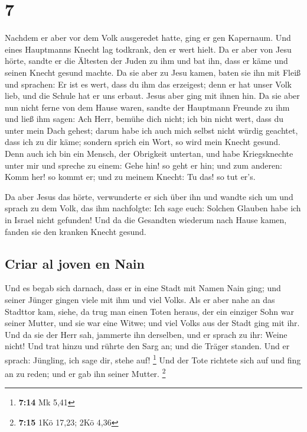 \hypertarget{section-6}{%
\section{7}\label{section-6}}

 Nachdem er aber vor dem Volk ausgeredet hatte, ging er
gen Kapernaum.  Und eines Hauptmanns Knecht lag todkrank,
den er wert hielt.  Da er aber von Jesu hörte, sandte er
die Ältesten der Juden zu ihm und bat ihn, dass er käme und seinen
Knecht gesund machte.  Da sie aber zu Jesu kamen, baten
sie ihn mit Fleiß und sprachen: Er ist es wert, dass du ihm das
erzeigest;  denn er hat unser Volk lieb, und die Schule
hat er uns erbaut.  Jesus aber ging mit ihnen hin. Da sie
aber nun nicht ferne von dem Hause waren, sandte der Hauptmann Freunde
zu ihm und ließ ihm sagen: Ach Herr, bemühe dich nicht; ich bin nicht
wert, dass du unter mein Dach gehest;  darum habe ich auch
mich selbst nicht würdig geachtet, dass ich zu dir käme; sondern sprich
ein Wort, so wird mein Knecht gesund.  Denn auch ich bin
ein Mensch, der Obrigkeit untertan, und habe Kriegsknechte unter mir und
spreche zu einem: Gehe hin! so geht er hin; und zum anderen: Komm her!
so kommt er; und zu meinem Knecht: Tu das! so tut er's.

 Da aber Jesus das hörte, verwunderte er sich über ihn und
wandte sich um und sprach zu dem Volk, das ihm nachfolgte: Ich sage
euch: Solchen Glauben habe ich in Israel nicht gefunden! 
Und da die Gesandten wiederum nach Hause kamen, fanden sie den kranken
Knecht gesund.

\hypertarget{criar-al-joven-en-nain}{%
\subsection{Criar al joven en Nain}\label{criar-al-joven-en-nain}}

 Und es begab sich darnach, dass er in eine Stadt mit
Namen Nain ging; und seiner Jünger gingen viele mit ihm und viel Volks.
 Als er aber nahe an das Stadttor kam, siehe, da trug man
einen Toten heraus, der ein einziger Sohn war seiner Mutter, und sie war
eine Witwe; und viel Volks aus der Stadt ging mit ihr. 
Und da sie der Herr sah, jammerte ihn derselben, und er sprach zu ihr:
Weine nicht!  Und trat hinzu und rührte den Sarg an; und
die Träger standen. Und er sprach: Jüngling, ich sage dir, stehe auf!
\footnote{\textbf{7:14} Mk 5,41}  Und der Tote richtete
sich auf und fing an zu reden; und er gab ihn seiner Mutter. \footnote{\textbf{7:15}
  1Kö 17,23; 2Kö 4,36}

